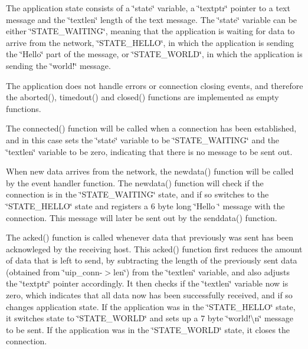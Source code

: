 The application state consists of a \char`\"{}state\char`\"{} variable, a \char`\"{}textptr\char`\"{} pointer to a text message and the \char`\"{}textlen\char`\"{} length of the text message. The \char`\"{}state\char`\"{} variable can be either \char`\"{}\+S\+T\+A\+T\+E\+\_\+\+W\+A\+I\+T\+I\+N\+G\char`\"{}, meaning that the application is waiting for data to arrive from the network, \char`\"{}\+S\+T\+A\+T\+E\+\_\+\+H\+E\+L\+L\+O\char`\"{}, in which the application is sending the \char`\"{}\+Hello\char`\"{} part of the message, or \char`\"{}\+S\+T\+A\+T\+E\+\_\+\+W\+O\+R\+L\+D\char`\"{}, in which the application is sending the \char`\"{}world!\char`\"{} message.

The application does not handle errors or connection closing events, and therefore the aborted(), timedout() and closed() functions are implemented as empty functions.

The connected() function will be called when a connection has been established, and in this case sets the \char`\"{}state\char`\"{} variable to be \char`\"{}\+S\+T\+A\+T\+E\+\_\+\+W\+A\+I\+T\+I\+N\+G\char`\"{} and the \char`\"{}textlen\char`\"{} variable to be zero, indicating that there is no message to be sent out.

When new data arrives from the network, the newdata() function will be called by the event handler function. The newdata() function will check if the connection is in the \char`\"{}\+S\+T\+A\+T\+E\+\_\+\+W\+A\+I\+T\+I\+N\+G\char`\"{} state, and if so switches to the \char`\"{}\+S\+T\+A\+T\+E\+\_\+\+H\+E\+L\+L\+O\char`\"{} state and registers a 6 byte long \char`\"{}\+Hello
\char`\"{} message with the connection. This message will later be sent out by the senddata() function.

The acked() function is called whenever data that previously was sent has been acknowleged by the receiving host. This acked() function first reduces the amount of data that is left to send, by subtracting the length of the previously sent data (obtained from \char`\"{}uip\+\_\+conn-\/$>$len\char`\"{}) from the \char`\"{}textlen\char`\"{} variable, and also adjusts the \char`\"{}textptr\char`\"{} pointer accordingly. It then checks if the \char`\"{}textlen\char`\"{} variable now is zero, which indicates that all data now has been successfully received, and if so changes application state. If the application was in the \char`\"{}\+S\+T\+A\+T\+E\+\_\+\+H\+E\+L\+L\+O\char`\"{} state, it switches state to \char`\"{}\+S\+T\+A\+T\+E\+\_\+\+W\+O\+R\+L\+D\char`\"{} and sets up a 7 byte \char`\"{}world!\textbackslash{}n\char`\"{} message to be sent. If the application was in the \char`\"{}\+S\+T\+A\+T\+E\+\_\+\+W\+O\+R\+L\+D\char`\"{} state, it closes the connection.

